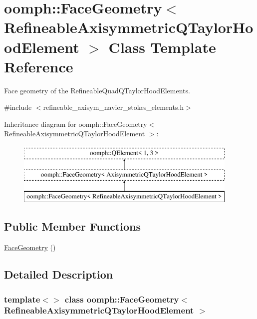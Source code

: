 \hypertarget{classoomph_1_1FaceGeometry_3_01RefineableAxisymmetricQTaylorHoodElement_01_4}{}\section{oomph\+:\+:Face\+Geometry$<$ Refineable\+Axisymmetric\+Q\+Taylor\+Hood\+Element $>$ Class Template Reference}
\label{classoomph_1_1FaceGeometry_3_01RefineableAxisymmetricQTaylorHoodElement_01_4}


Face geometry of the Refineable\+Quad\+Q\+Taylor\+Hood\+Elements.  




{\ttfamily \#include $<$refineable\+\_\+axisym\+\_\+navier\+\_\+stokes\+\_\+elements.\+h$>$}

Inheritance diagram for oomph\+:\+:Face\+Geometry$<$ Refineable\+Axisymmetric\+Q\+Taylor\+Hood\+Element $>$\+:\begin{figure}[H]
\begin{center}
\leavevmode
\includegraphics[height=3.000000cm]{classoomph_1_1FaceGeometry_3_01RefineableAxisymmetricQTaylorHoodElement_01_4}
\end{center}
\end{figure}
\subsection*{Public Member Functions}
\begin{DoxyCompactItemize}
\item 
\hyperlink{classoomph_1_1FaceGeometry_3_01RefineableAxisymmetricQTaylorHoodElement_01_4_a8d7c1424438b8b1b3d48878415f64d47}{Face\+Geometry} ()
\end{DoxyCompactItemize}


\subsection{Detailed Description}
\subsubsection*{template$<$$>$\newline
class oomph\+::\+Face\+Geometry$<$ Refineable\+Axisymmetric\+Q\+Taylor\+Hood\+Element $>$}

